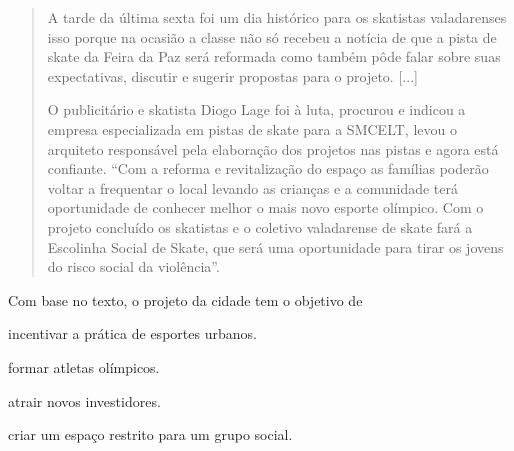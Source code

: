 \begin{quote}
A tarde da última sexta foi um dia histórico para os skatistas
valadarenses isso porque na ocasião a classe não só recebeu a notícia de
que a pista de skate da Feira da Paz será reformada como também pôde
falar sobre suas expectativas, discutir e sugerir propostas para o
projeto. {[}...{]}

O publicitário e skatista Diogo Lage foi à luta, procurou e indicou a
empresa especializada em pistas de skate para a SMCELT, levou o
arquiteto responsável pela elaboração dos projetos nas pistas e agora
está confiante. ``Com a reforma e revitalização do espaço as famílias
poderão voltar a frequentar o local levando as crianças e a comunidade
terá oportunidade de conhecer melhor o mais novo esporte olímpico. Com o
projeto concluído os skatistas e o coletivo valadarense de skate fará a
Escolinha Social de Skate, que será uma oportunidade para tirar os
jovens do risco social da violência''.

\end{quote}

Com base no texto, o projeto da cidade tem o objetivo de

\begin{escolha}
\item incentivar a prática de esportes urbanos.

\item formar atletas olímpicos.

\item atrair novos investidores.

\item criar um espaço restrito para um grupo social.
\end{escolha}


